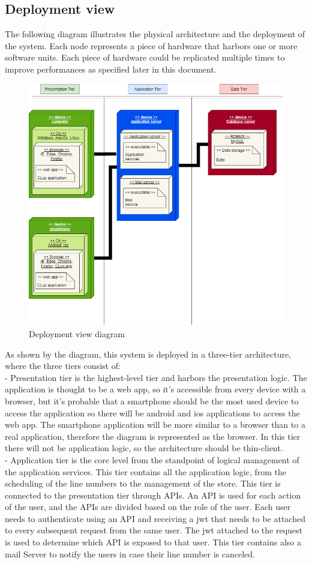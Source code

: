 \subsection{Deployment view}
The following diagram illustrates the physical architecture and the
deployment of the system.
Each node represents a piece of hardware that harbors one or more software units.
Each piece of hardware could be replicated multiple times to improve performances as specified later in this document.

\begin{figure}[H]
    \centering
    \hspace*{-3.5cm}
    \includegraphics[height=0.7\textwidth]{Images/TierDiagram.png}
    \caption{Deployment view diagram}
\end{figure}

As shown by the diagram, this system is deployed in a three-tier
architecture, where the three tiers consist of: \\
- Presentation tier is the highest-level tier and harbors the presentation logic.
The application is thought to be a web app, so it's accessible from every device with a browser, but it's probable that
a smartphone should be the most used device to access the application so there will be android and ios applications to access
the web app.
The smartphone application will be more similar to a browser than to a real application, therefore the diagram is represented as the browser.
In this tier there will not be application logic, so the architecture should be thin-client.\\
- Application tier is the core level from the standpoint of logical management of the application services.
This tier contains all the application logic, from the scheduling of the line numbers to the management of the store.
This tier is connected to the presentation tier through APIs.
An API is used for each action of the user, and the APIs are divided based on the role of the user.
Each user needs to authenticate using an API and receiving a jwt that needs to be attached to every subsequent request from the same user.
The jwt attached to the request is used to determine which API is exposed to that user.
This tier contains also a mail Server to notify the users in case their line number is canceled. \\

